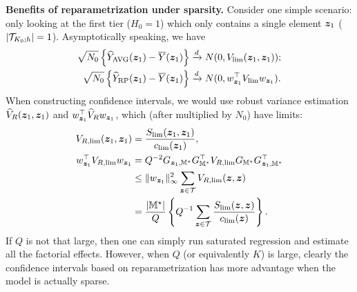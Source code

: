 \documentclass[12pt]{article}
\begin{document}
\textbf{Benefits of reparametrization under sparsity.} Consider one simple scenario: only looking at the first tier ($H_0 = 1$) which only contains a single element ${\boldsymbol{z}}_1$ ($|{\mathcal{T}}_{K_0;h}| = 1$). Asymptotically speaking, we have
\begin{align*}
    \sqrt{N_0} \left\{{\widehat{Y}}_{\operatorname{AVG}}({\boldsymbol{z}}_1) - \overline{Y}({\boldsymbol{z}}_1)\right\} &\xrightarrow{d} N(0, V_{\lim}({\boldsymbol{z}}_1,{\boldsymbol{z}}_1));\\
    \sqrt{N_0} \left\{{\widehat{Y}}_{\operatorname{RP}}({\boldsymbol{z}}_1) - \overline{Y}({\boldsymbol{z}}_1)\right\} &\xrightarrow{d} N(0, w_{{\boldsymbol{z}}_1}^\top V_{\lim}w_{{\boldsymbol{z}}_1}).
\end{align*}
When constructing confidence intervals, we would use robust variance estimation $\widehat{V}_R({\boldsymbol{z}}_1,{\boldsymbol{z}}_1)$ and $w_{{\boldsymbol{z}}_1}^\top \widehat{V}_R w_{{\boldsymbol{z}}_1}$, which (after multiplied by $N_0$) have limits: 
\begin{align*}
    V_{R,\lim}({\boldsymbol{z}}_1,{\boldsymbol{z}}_1) &= \frac{S_{\lim}({\boldsymbol{z}}_1,{\boldsymbol{z}}_1)}{c_{\lim}({\boldsymbol{z}}_1)}, \\
    w_{{\boldsymbol{z}}_1}^\top V_{R,\lim}w_{{\boldsymbol{z}}_1} & = Q^{-2} G_{{\boldsymbol{z}}_1, {\mathbb{M}}^\star}G_{{\mathbb{M}}^\star}^\top  V_{R,\lim}  G_{{\mathbb{M}}^\star} G_{{\boldsymbol{z}}_1, {\mathbb{M}}^\star}^\top\\
    & \le \|w_{{\boldsymbol{z}}_1}\|_\infty^2 \sum_{{\boldsymbol{z}}\in{\mathcal{T}}} V_{R,\lim}({\boldsymbol{z}},{\boldsymbol{z}})\\
    & = \frac{|{\mathbb{M}}^\star|}{Q} \left\{Q^{-1} \sum_{{\boldsymbol{z}}\in{\mathcal{T}}} \frac{S_{\lim}({\boldsymbol{z}},{\boldsymbol{z}})}{c_{\lim}({\boldsymbol{z}})}\right\}.
\end{align*}
If $Q$ is not that large, then one can simply run saturated regression and estimate all the factorial effects. However, when $Q$ (or equivalently $K$) is large, clearly the confidence intervals based on reparametrization has more advantage when the model is actually sparse. 
\end{document}
